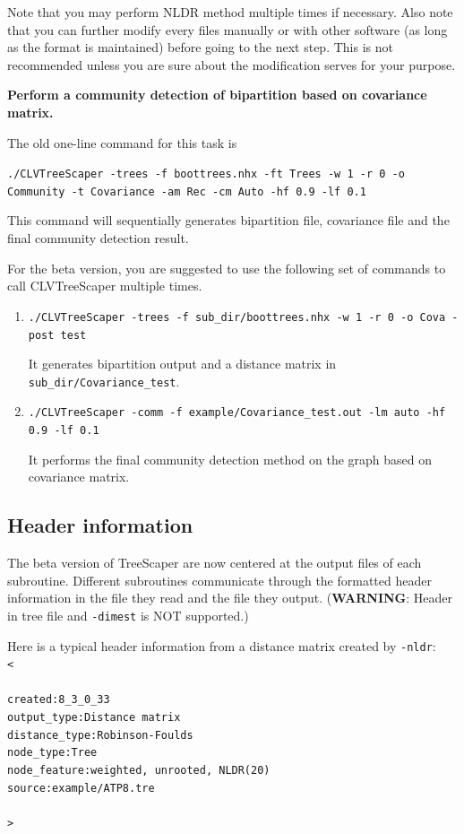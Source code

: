 \documentclass[11pt,a4paper]{article}
\theoremstyle{definition}
\theoremstyle{definition}
\numberwithin{equation}{section}
\begin{document}
	Note that you may perform NLDR method multiple times if necessary. Also note that you can further modify every files manually or with other software (as long as the format is maintained) before going to the next step. This is not recommended unless you are sure about the modification serves for your purpose.

	\textbf{Perform a community detection of bipartition based on covariance matrix.}
	
	The old one-line command for this task is
	
	\texttt{./CLVTreeScaper -trees -f boottrees.nhx -ft Trees -w 1 -r 0 -o Community -t Covariance -am Rec -cm Auto -hf 0.9 -lf 0.1}
	
	This command will sequentially generates bipartition file, covariance file and the final community detection result.
	
	For the beta version, you are suggested to use the following set of commands to call CLVTreeScaper multiple times.

	\begin{enumerate}
		\item \texttt{./CLVTreeScaper -trees -f sub\_dir/boottrees.nhx -w 1 -r 0 -o Cova -post test}
		
		It generates bipartition output and a distance matrix in \texttt{sub\_dir/Covariance\_test}.
		
		\item \texttt{./CLVTreeScaper -comm -f example/Covariance\_test.out -lm auto -hf 0.9 -lf 0.1}
		
		It performs the final community detection method on the graph based on covariance matrix. 
	\end{enumerate}

	
	\subsection{Header information}
	
	The beta version of TreeScaper are now centered at the output files of each subroutine. Different subroutines communicate through the formatted header information in the file they read and the file they output. (\textbf{WARNING}: Header in tree file and \texttt{-dimest} is NOT supported.)
	
	Here is a typical header information from a distance matrix created by \texttt{-nldr}:
	\\
	\texttt{<}
	\\
	\\
	\texttt{created:8\_3\_0\_33}
	\\
	\texttt{output\_type:Distance matrix}
	\\
	\texttt{distance\_type:Robinson-Foulds}
	\\
	\texttt{node\_type:Tree}
	\\
	\texttt{node\_feature:weighted, unrooted, NLDR(20)}
	\\
	\texttt{source:example/ATP8.tre}
	\\
	\\
	\texttt{>}
	
\end{document}
